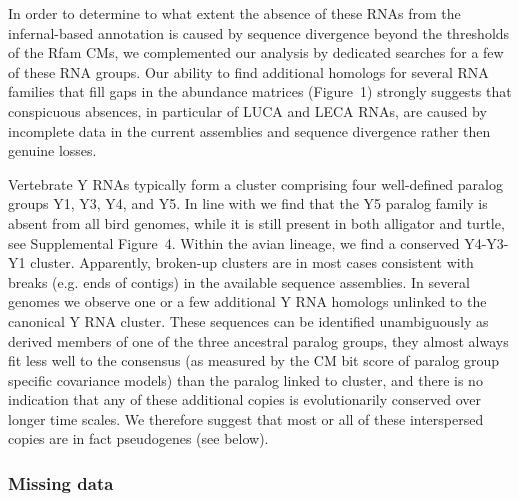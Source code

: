\documentclass[10pt]{bmc_article}
\newenvironment{bmcformat}{\begin{raggedright}\baselineskip20pt\sloppy\setboolean{publ}{false}}{\end{raggedright}\baselineskip20pt\sloppy}
\begin{document}
\begin{bmcformat}
In order to determine to what extent the absence of these RNAs from
the infernal-based annotation is caused by sequence divergence beyond
the thresholds of the Rfam CMs, we complemented our analysis by
dedicated searches for a few of these RNA groups. Our ability to find
additional homologs for several RNA families that fill gaps in the
abundance matrices (Figure~1) strongly suggests that conspicuous
absences, in particular of LUCA and LECA RNAs, are caused by
incomplete data in the current assemblies and sequence divergence
rather then genuine losses.

Vertebrate Y RNAs typically form a cluster comprising four
well-defined paralog groups Y1, Y3, Y4, and Y5. In line with
\cite{Mosig:07a} we find that the Y5 paralog family is absent from all
bird genomes, while it is still present in both alligator and turtle,
see Supplemental Figure~4. Within the avian lineage, we find a
conserved Y4-Y3-Y1 cluster. Apparently, broken-up clusters are in most
cases consistent with breaks (e.g. ends of contigs) in the available
sequence assemblies.  In several genomes we observe one or a few
additional Y RNA homologs unlinked to the canonical Y RNA
cluster. These sequences can be identified unambiguously as derived
members of one of the three ancestral paralog groups, they almost
always fit less well to the consensus (as measured by the CM bit score
of paralog group specific covariance models) than the paralog linked
to cluster, and there is no indication that any of these additional
copies is evolutionarily conserved over longer time scales. We
therefore suggest that most or all of these interspersed copies are in
fact pseudogenes (see below).

\subsubsection*{Missing data}


\end{bmcformat}
\end{document}
